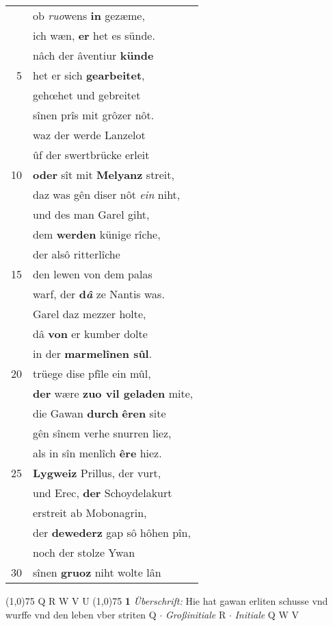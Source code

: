 \documentclass[8pt,a4paper,notitlepage]{article}
\begin{document}
\begin{table}[ht]
\begin{minipage}[t]{0.5\linewidth}
\begin{tabular}{rl}
 & ob \textit{ruo}wens \textbf{in} gezæme,\\ 
 & ich wæn, \textbf{er} het es sünde.\\ 
 & nâch der âventiur \textbf{künde}\\ 
5 & het er sich \textbf{gearbeitet},\\ 
 & gehœhet und gebreitet\\ 
 & sînen prîs mit grôzer nôt.\\ 
 & waz der werde Lanzelot\\ 
 & ûf der swertbrücke erleit\\ 
10 & \textbf{oder} sît mit \textbf{Melyanz} streit,\\ 
 & daz was gên diser nôt \textit{ein} niht,\\ 
 & und des man Garel giht,\\ 
 & dem \textbf{werden} künige rîche,\\ 
 & der alsô ritterlîche\\ 
15 & den lewen von dem palas\\ 
 & warf, der \textbf{d\textit{â}} ze Nantis was.\\ 
 & Garel daz mezzer holte,\\ 
 & dâ \textbf{von} er kumber dolte\\ 
 & in der \textbf{marmelînen sûl}.\\ 
20 & trüege dise pfîle ein mûl,\\ 
 & \textbf{der} wære \textbf{zuo vil geladen} mite,\\ 
 & die Gawan \textbf{durch} \textbf{êren} site\\ 
 & gên sînem verhe snurren liez,\\ 
 & als in sîn menlîch \textbf{êre} hiez.\\ 
25 & \textbf{Lygweiz} Prillus, der vurt,\\ 
 & und Erec, \textbf{der} Schoydelakurt\\ 
 & erstreit ab Mobonagrin,\\ 
 & der \textbf{dewederz} gap sô hôhen pîn,\\ 
 & noch der stolze Ywan\\ 
30 & sînen \textbf{gruoz} niht wolte lân\\ 
\end{tabular}
\scriptsize
\line(1,0){75} \newline
Q R W V U \newline
\line(1,0){75} \newline
\textbf{1} \textit{Überschrift:} Hie hat gawan erliten schusse vnd wurffe vnd den leben vber striten Q   $\cdot$ \textit{Großinitiale} R   $\cdot$ \textit{Initiale} Q W V  \newline

\end{minipage}
\end{table}
\end{document}
